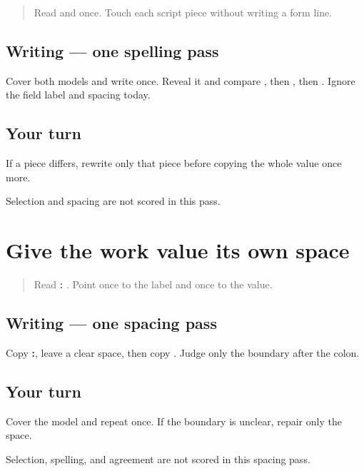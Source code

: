 \begin{quote}
Read \textbf{} and \textbf{} once. Touch each script piece without writing a form line.
\end{quote}

\subsection*{Writing — one spelling pass}
Cover both models and write \textbf{} once. Reveal it and compare \textbf{}, then \textbf{}, then \textbf{}. Ignore the field label and spacing today.

\subsection*{Your turn}
If a piece differs, rewrite only that piece before copying the whole value once more.

\begin{tcolorbox}[breakable,colback=teal!4,colframe=teal!35!black,title={Before you move on}]
Selection and spacing are not scored in this pass.
\end{tcolorbox}
\section[\texorpdfstring{\pa{ਕੰਮ}: \pa{ਖੇਤੀ} (work field spacing)}{ਕੰਮ: ਖੇਤੀ (work field spacing)}]{Give the work value its own space}

\label{lesson:PA-W05-work-spacing}



\begin{quote}
Read \textbf{: }. Point once to the label and once to the value.
\end{quote}

\subsection*{Writing — one spacing pass}
Copy \textbf{:}, leave a clear space, then copy \textbf{}. Judge only the boundary after the colon.

\subsection*{Your turn}
Cover the model and repeat once. If the boundary is unclear, repair only the space.

\begin{tcolorbox}[breakable,colback=teal!4,colframe=teal!35!black,title={Before you move on}]
Selection, spelling, and agreement are not scored in this spacing pass.
\end{tcolorbox}
